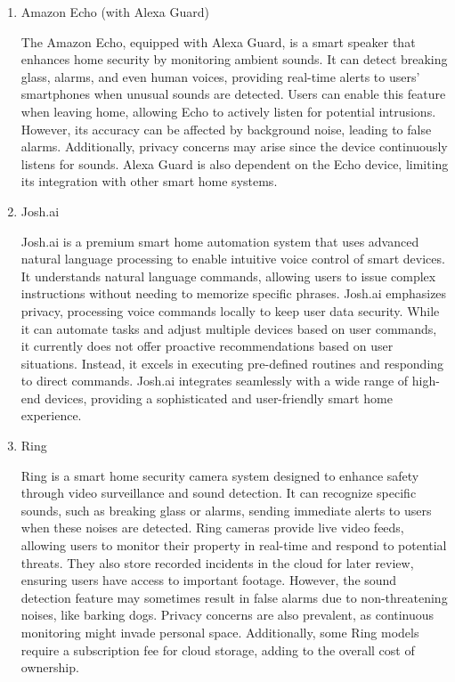 \documentclass[conference]{IEEEtran}
\begin{document}
\begin{enumerate}[label=\arabic*]
    \vspace{1em}

    \item Amazon Echo (with Alexa Guard)\par
    \vspace{0.3em}
    The Amazon Echo, equipped with Alexa Guard, is a smart speaker that enhances home security by monitoring ambient sounds. It can detect breaking glass, alarms, and even human voices, providing real-time alerts to users’ smartphones when unusual sounds are detected. Users can enable this feature when leaving home, allowing Echo to actively listen for potential intrusions. However, its accuracy can be affected by background noise, leading to false alarms. Additionally, privacy concerns may arise since the device continuously listens for sounds. Alexa Guard is also dependent on the Echo device, limiting its integration with other smart home systems.
    
    \vspace{1em}

    \item Josh.ai\par
    \vspace{0.3em}
    Josh.ai is a premium smart home automation system that uses advanced natural language processing to enable intuitive voice control of smart devices. It understands natural language commands, allowing users to issue complex instructions without needing to memorize specific phrases. Josh.ai emphasizes privacy, processing voice commands locally to keep user data security. While it can automate tasks and adjust multiple devices based on user commands, it currently does not offer proactive recommendations based on user situations. Instead, it excels in executing pre-defined routines and responding to direct commands. Josh.ai integrates seamlessly with a wide range of high-end devices, providing a sophisticated and user-friendly smart home experience.    

    \vspace{1em}

    \item Ring\par
    \vspace{0.3em}
    Ring is a smart home security camera system designed to enhance safety through video surveillance and sound detection. It can recognize specific sounds, such as breaking glass or alarms, sending immediate alerts to users when these noises are detected. Ring cameras provide live video feeds, allowing users to monitor their property in real-time and respond to potential threats. They also store recorded incidents in the cloud for later review, ensuring users have access to important footage. However, the sound detection feature may sometimes result in false alarms due to non-threatening noises, like barking dogs. Privacy concerns are also prevalent, as continuous monitoring might invade personal space. Additionally, some Ring models require a subscription fee for cloud storage, adding to the overall cost of ownership.
\end{enumerate}
\end{document}
